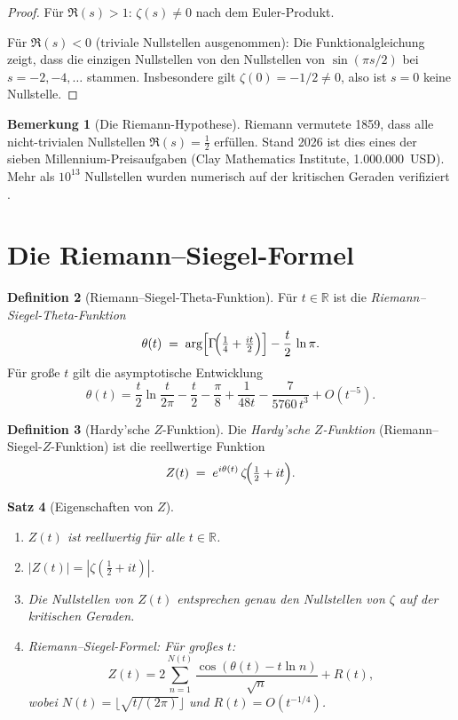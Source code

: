 \documentclass[12pt,a4paper]{amsart}
\newtheorem{theorem}{Satz}[section]
\theoremstyle{definition}
\newtheorem{definition}[theorem]{Definition}
\newtheorem{remark}[theorem]{Bemerkung}
\newcommand{\R}{\mathbb{R}}
\begin{document}
\begin{proof}
F\"ur $\Re(s) > 1$: $\zeta(s) \ne 0$ nach dem Euler-Produkt.

F\"ur $\Re(s) < 0$ (triviale Nullstellen ausgenommen): Die Funktionalgleichung
zeigt, dass die einzigen Nullstellen von den Nullstellen von $\sin(\pi s/2)$
bei $s = -2, -4, \ldots$ stammen.
Insbesondere gilt $\zeta(0) = -1/2 \ne 0$, also ist $s=0$ keine Nullstelle.
\end{proof}

\begin{remark}[Die Riemann-Hypothese]
\label{rem:rh}
Riemann vermutete 1859, dass alle nicht-trivialen Nullstellen
$\Re(s) = \tfrac{1}{2}$ erf\"ullen.
Stand 2026 ist dies eines der sieben Millennium-Preisaufgaben
(Clay Mathematics Institute, 1.000.000~USD).
Mehr als $10^{13}$ Nullstellen wurden numerisch auf der kritischen
Geraden verifiziert \cite{Platt2021}.
\end{remark}

\section{Die Riemann--Siegel-Formel}

\begin{definition}[Riemann--Siegel-Theta-Funktion]
\label{def:theta}
F\"ur $t \in \R$ ist die \emph{Riemann--Siegel-Theta-Funktion}
\[
  \theta(t) \;=\; \arg\!\left[\Gamma\!\Bigl(\tfrac{1}{4} + \tfrac{it}{2}\Bigr)\right]
  - \frac{t}{2}\,\ln\pi.
\]
F\"ur gro\ss e $t$ gilt die asymptotische Entwicklung
\[
  \theta(t) = \frac{t}{2}\ln\frac{t}{2\pi} - \frac{t}{2} - \frac{\pi}{8}
  + \frac{1}{48t} - \frac{7}{5760\,t^3} + O(t^{-5}).
\]
\end{definition}

\begin{definition}[Hardy'sche $Z$-Funktion]
\label{def:Z_function}
Die \emph{Hardy'sche $Z$-Funktion} (Riemann--Siegel-$Z$-Funktion) ist
die reellwertige Funktion
\[
  Z(t) \;=\; e^{i\theta(t)}\,\zeta\!\Bigl(\tfrac{1}{2} + it\Bigr).
\]
\end{definition}

\begin{theorem}[Eigenschaften von $Z$]
\label{thm:Z_properties}
\begin{enumerate}
  \item[\textup{(i)}] $Z(t)$ ist reellwertig f\"ur alle $t \in \R$.
  \item[\textup{(ii)}] $|Z(t)| = |\zeta(\tfrac{1}{2} + it)|$.
  \item[\textup{(iii)}] Die Nullstellen von $Z(t)$ entsprechen genau
    den Nullstellen von $\zeta$ auf der kritischen Geraden.
  \item[\textup{(iv)}] Riemann--Siegel-Formel: F\"ur gro\ss es $t$:
    \[
      Z(t) = 2\sum_{n=1}^{N(t)} \frac{\cos(\theta(t) - t\ln n)}{\sqrt{n}}
      + R(t),
    \]
    wobei $N(t) = \lfloor\sqrt{t/(2\pi)}\rfloor$ und $R(t) = O(t^{-1/4})$.
\end{enumerate}
\end{theorem}
\end{document}

